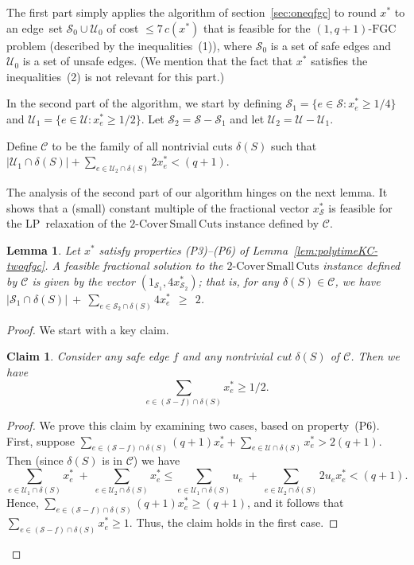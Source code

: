 \documentclass[11pt]{article}
\newtheorem{lemma}[theorem]{Lemma}
\newtheorem{claim}[theorem]{Claim}
\newcommand{\safe}{\mathscr{S}}
\newcommand{\unsafe}{\mathscr{U}}
\newcommand{\fgc}{\mathrm{FGC}}
\newcommand{\oneqplusfgc}{(1,q+1)\text{-}\fgc}
\newcommand{\C}{\mathscr{C}}
\newcommand\twoASC{\mathrm{2\text{-}Cover\,Small\,Cuts}}
\begin{document}
{{The first part simply applies the algorithm of section~\ref{sec:oneqfgc}
to round $x^*$ to an edge~set $\safe_0\cup\unsafe_0$ of cost
$\leq7\,c(x^*)$ that is feasible for the $\oneqplusfgc$ problem
(described by the inequalities~(1)), where $\safe_0$ is a set of
safe edges and $\unsafe_0$ is a set of unsafe edges.
(We mention that the fact that $x^*$ satisfies the inequalities~(2)
is not relevant for this part.)


In the second part of the algorithm, we start by
defining $\safe_1 = \{e\in\safe: x^*_e\geq 1/4\}$ and
$\unsafe_1 = \{e\in\unsafe: x^*_e\geq 1/2\}$.
Let $\safe_2 = \safe - \safe_1$ and
let $\unsafe_2 = \unsafe - \unsafe_1$.

Define $\C$ to be the family of all nontrivial cuts $\delta(S)$ such that
$|\unsafe_1\cap \delta(S)| + \sum_{e\in \unsafe_2 \cap\delta(S)} 2x^*_e < (q+1)$.


{
The analysis of the second part of our algorithm hinges on the next
lemma.  It shows that a (small) constant multiple of the fractional
vector $x^*_{\safe}$ is feasible for the LP~relaxation of the
$\twoASC$ instance defined by $\C$.

\begin{lemma} \label{lem:safepart-twoqfgc}
Let $x^*$ satisfy properties (P3)--(P6) of Lemma~\ref{lem:polytimeKC-twoqfgc}.
A feasible fractional solution to the $\twoASC$ instance defined
by $\C$ is given by the vector $(1_{\safe_1}, 4 x^*_{\safe_2})$; that is,
for any $\delta(S)\in\C$, we have
$|\safe_1\cap\delta(S)| \:+\: \sum_{e\in \safe_2\cap\delta(S)} 4x^*_e \:\:\geq\:\: 2$.
\end{lemma}

\begin{proof}
We start with a key claim.

\begin{claim}\label{clm:kci-safe1}
Consider any safe edge $f$ and any nontrivial cut $\delta(S)$ of $\C$.
Then we have
$$\sum_{e\in (\safe - f)\cap \delta(S)} x^*_e \geq 1/2.$$
\end{claim}
\begin{proof}
We prove this claim by examining two cases, based on property~(P6).
First, suppose
$\sum_{e\in(\safe-f)\cap\delta(S)} (q+1) x^*_e +
\sum_{e\in\unsafe\cap\delta(S)} x^*_e > 2(q+1)$.
Then (since $\delta(S)$ is in $\C$) we have
$$\sum_{e\in\unsafe_1\cap\delta(S)}x^*_e \;+\;
\sum_{e\in\unsafe_2\cap\delta(S)}x^*_e \le
\sum_{e\in \unsafe_1\cap\delta(S)}u_e
\;+\; \sum_{e\in \unsafe_2\cap\delta(S)} {2} u_ex^*_e < (q+1).$$
Hence, $\sum_{e\in(\safe-f)\cap\delta(S)} (q+1) x^*_e \geq (q+1)$,
and it follows that
$\sum_{e\in(\safe-f)\cap\delta(S)} x^*_e \geq 1$.
Thus, the claim holds in the first case.


\end{proof}
\end{proof}}}}
\end{document}
